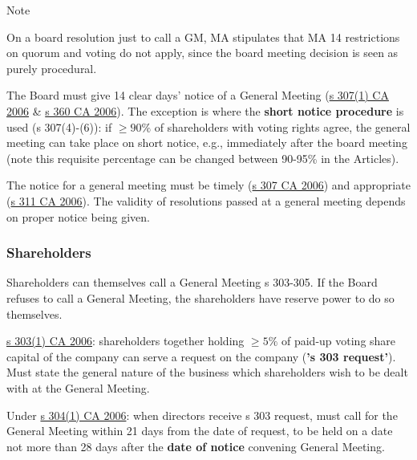 \documentclass[
]{article}
\newenvironment{env-09c22fe6-da77-4ae9-aa04-0de4f43f634a}
{
    \savenotes\tcolorbox[blanker,breakable,left=5pt,borderline west={2pt}{-4pt}{blue}]
}
{
    \endtcolorbox\spewnotes
}
\begin{document}
\begin{env-09c22fe6-da77-4ae9-aa04-0de4f43f634a}

Note

On a board resolution just to call a GM, MA stipulates that MA 14
restrictions on quorum and voting do not apply, since the board meeting
decision is seen as purely procedural.

\end{env-09c22fe6-da77-4ae9-aa04-0de4f43f634a}

The Board must give 14 clear days' notice of a General Meeting
(\href{https://www.legislation.gov.uk/ukpga/2006/46/section/307}{s
307(1) CA 2006} \&
\href{https://www.legislation.gov.uk/ukpga/2006/46/section/360}{s 360 CA
2006}). The exception is where the \textbf{short notice procedure} is
used (s 307(4)-(6)): if {\(\geq 90\%\)} of shareholders with voting
rights agree, the general meeting can take place on short notice, e.g.,
immediately after the board meeting (note this requisite percentage can
be changed between 90-95\% in the Articles).

The notice for a general meeting must be timely
(\href{https://www.legislation.gov.uk/ukpga/2006/46/section/307}{s 307
CA 2006}) and appropriate
(\href{https://www.legislation.gov.uk/ukpga/2006/46/section/311}{s 311
CA 2006}). The validity of resolutions passed at a general meeting
depends on proper notice being given.

\hypertarget{shareholders}{%
\subsubsection{Shareholders}\label{shareholders}}

Shareholders can themselves call a General Meeting s 303-305. If the
Board refuses to call a General Meeting, the shareholders have reserve
power to do so themselves.

\href{https://www.legislation.gov.uk/ukpga/2006/46/section/303}{s 303(1)
CA 2006}: shareholders together holding {\(\geq 5\%\)} of paid-up voting
share capital of the company can serve a request on the company
(\textbf{'s 303 request'}). Must state the general nature of the
business which shareholders wish to be dealt with at the General
Meeting.

Under \href{https://www.legislation.gov.uk/ukpga/2006/46/section/304}{s
304(1) CA 2006}: when directors receive s 303 request, must call for the
General Meeting within 21 days from the date of request, to be held on a
date not more than 28 days after the \textbf{date of notice} convening
General Meeting.
\end{document}
